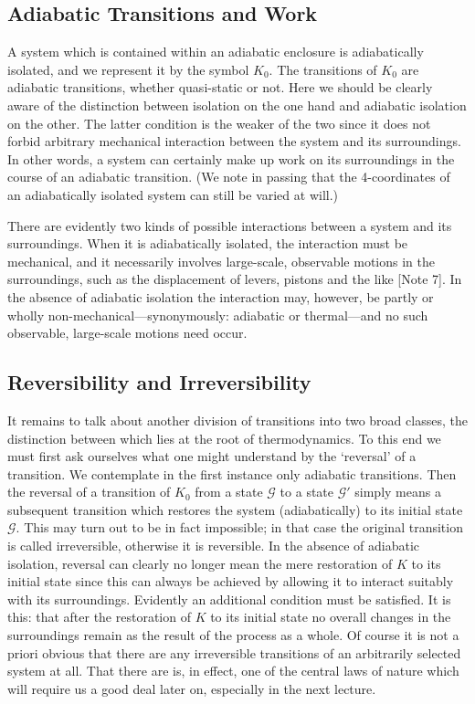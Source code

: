 \documentclass{article}
\theoremstyle{definition}
\begin{document}
\subsection{Adiabatic Transitions and Work}
A system which is contained within an adiabatic enclosure is adiabatically isolated, and we represent it by the symbol \( K_0 \). The transitions of \( K_0 \) are adiabatic transitions, whether quasi-static or not. Here we should be clearly aware of the distinction between isolation on the one hand and adiabatic isolation on the other. The latter condition is the weaker of the two since it does not forbid arbitrary mechanical interaction between the system and its surroundings. In other words, a system can certainly make up work on its surroundings in the course of an adiabatic transition. (We note in passing that the 4-coordinates of an adiabatically isolated system can still be varied at will.)

There are evidently two kinds of possible interactions between a system and its surroundings. When it is adiabatically isolated, the interaction must be mechanical, and it necessarily involves large-scale, observable motions in the surroundings, such as the displacement of levers, pistons and the like [Note 7]. In the absence of adiabatic isolation the interaction may, however, be partly or wholly non-mechanical—synonymously: adiabatic or thermal—and no such observable, large-scale motions need occur.

\subsection{Reversibility and Irreversibility}
It remains to talk about another division of transitions into two broad classes, the distinction between which lies at the root of thermodynamics. To this end we must first ask ourselves what one might understand by the ‘reversal’ of a transition. We contemplate in the first instance only adiabatic transitions. Then the reversal of a transition of \( K_0 \) from a state \(\mathcal{G}\) to a state \(\mathcal{G}'\) simply means a subsequent transition which restores the system (adiabatically) to its initial state \(\mathcal{G}\). This may turn out to be in fact impossible; in that case the original transition is called irreversible, otherwise it is reversible. In the absence of adiabatic isolation, reversal can clearly no longer mean the mere restoration of \( K \) to its initial state since this can always be achieved by allowing it to interact suitably with its surroundings. Evidently an additional condition must be satisfied. It is this: that after the restoration of \( K \) to its initial state no overall changes in the surroundings remain as the result of the process as a whole. Of course it is not a priori obvious that there are any irreversible transitions of an arbitrarily selected system at all. That there are is, in effect, one of the central laws of nature which will require us a good deal later on, especially in the next lecture.
\end{document}
